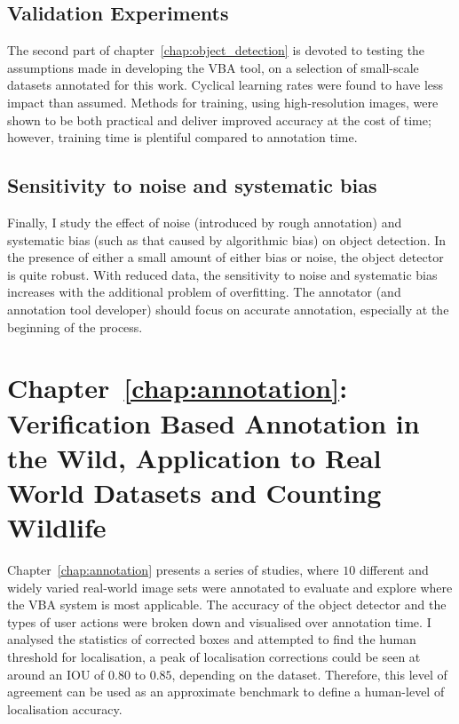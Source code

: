 \subsection{Validation Experiments}

The second part of chapter~\ref{chap:object_detection} is devoted to testing the assumptions made in developing the \gls{VBA} tool, on a selection of small-scale datasets annotated for this work. Cyclical learning rates were found to have less impact than assumed. Methods for training, using high-resolution images, were shown to be both practical and deliver improved accuracy at the cost of time; however, training time is plentiful compared to annotation time. 

\subsection{Sensitivity to noise and systematic bias}

Finally, I study the effect of noise (introduced by rough annotation) and systematic bias (such as that caused by algorithmic bias) on object detection. In the presence of either a small amount of either bias or noise, the object detector is quite robust. With reduced data, the sensitivity to noise and systematic bias increases with the additional problem of overfitting. The annotator (and annotation tool developer) should focus on accurate annotation, especially at the beginning of the process. 

\section{Chapter~\ref{chap:annotation}: Verification Based Annotation in the Wild, Application to Real World Datasets and Counting Wildlife}

 Chapter~\ref{chap:annotation} presents a series of studies, where $10$ different and widely varied real-world image sets were annotated to evaluate and explore where the \gls{VBA} system is most applicable. The accuracy of the object detector and the types of user actions were broken down and visualised over annotation time. I analysed the statistics of corrected boxes and attempted to find the human threshold for localisation, a peak of localisation corrections could be seen at around an \gls{IOU} of $0.80$ to $0.85$, depending on the dataset. Therefore, this level of agreement can be used as an approximate benchmark to define a human-level of localisation accuracy.

